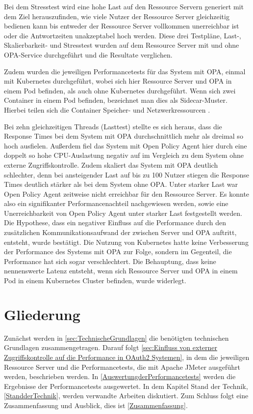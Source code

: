 Bei dem Stresstest wird eine hohe Last auf den Ressource Servern generiert mit dem Ziel herauszufinden, wie viele Nutzer der Ressource Server gleichzeitig bedienen kann bis entweder der Ressource Server vollkommen unerreichbar ist oder die Antwortzeiten unakzeptabel hoch werden. Diese drei Testpläne, Last-, Skalierbarkeit- und Stresstest wurden auf dem Ressource Server mit und ohne OPA-Service durchgeführt und die Resultate verglichen.\smallskip

Zudem wurden die jeweiligen Performancetests für das System mit OPA, einmal mit Kubernetes durchgeführt, wobei sich hier Ressource Server und OPA in einem Pod befinden, als auch ohne Kubernetes durchgeführt. Wenn sich zwei Container in einem Pod befinden, bezeichnet man dies als Sidecar-Muster. Hierbei teilen sich die Container Speicher- und Netzwerkressourcen \citep{sidecar:2017}.\smallskip

Bei zehn gleichzeitigen Threads (Lasttest) stellte es sich heraus, dass die Response Times bei dem System mit OPA durchschnittlich mehr als dreimal so hoch ausfielen. Außerdem fiel das System mit Open Policy Agent hier durch eine doppelt so hohe \ac{CPU}-Auslastung negativ auf im Vergleich zu dem System ohne externe Zugriffskontrolle. Zudem skaliert das System mit \ac*{OPA} deutlich schlechter, denn bei ansteigender Last auf bis zu 100 Nutzer stiegen die Response Times deutlich stärker als bei dem System ohne OPA. Unter starker Last war Open Policy Agent zeitweise nicht erreichbar für den Ressource Server. Es konnte also ein signifikanter Performancenachteil nachgewiesen werden, sowie eine Unerreichbarkeit von Open Policy Agent unter starker Last festgestellt werden. Die Hypothese, dass ein negativer Einfluss auf die Performance durch den zusätzlichen Kommunikationsaufwand der zwischen Server und \ac*{OPA} auftritt, entsteht, wurde bestätigt. Die Nutzung von Kubernetes hatte keine Verbesserung der Performance des Systems mit OPA zur Folge, sondern im Gegenteil, die Performance hat sich sogar verschlechtert. Die Behauptung, dass keine nennenswerte Latenz entsteht, wenn sich Ressource Server und OPA in einem Pod in einem Kubernetes Cluster befinden, wurde widerlegt. 

%
%
\section{Gliederung}
\label{sec:intro:structure}
Zunächst werden in \autoref{sec:TechnischeGrundlagen} die benötigten technischen Grundlagen zusammengetragen. Darauf folgt \autoref{sec:Einfluss von externer Zugriffskontrolle auf die Performance in OAuth2 Systemen}, in dem die jeweiligen Ressource Server und die Performancetests, die mit Apache JMeter ausgeführt werden, beschrieben werden. In \autoref{AuswertungderPerformancetests} werden die Ergebnisse der Performancetests ausgewertet. In dem Kapitel Stand der Technik, \autoref{StandderTechnik}, werden verwandte Arbeiten diskutiert. Zum Schluss folgt eine Zusammenfassung und Ausblick, dies ist \autoref{Zusammenfassung}. 
